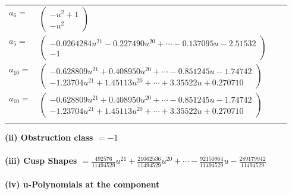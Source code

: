 \documentclass[1p]{elsarticle_modified}
\theoremstyle{definition}
\begin{document}
\begin{tabular}{m{7pt} m{180pt} m{7pt} m{180pt} }
\flushright $a_{6}=$&$\begin{pmatrix}- u^2+1\\- u^2\end{pmatrix}$ \\
\flushright $a_{5}=$&$\begin{pmatrix}-0.0264284 u^{21}-0.227490 u^{20}+\cdots-0.137095 u-2.51532\\-1\end{pmatrix}$ \\
\flushright $a_{10}=$&$\begin{pmatrix}-0.628809 u^{21}+0.408950 u^{20}+\cdots-0.851245 u-1.74742\\-1.23704 u^{21}+1.45113 u^{20}+\cdots+3.35522 u+0.270710\end{pmatrix}$\\ \flushright $a_{10}=$&$\begin{pmatrix}-0.628809 u^{21}+0.408950 u^{20}+\cdots-0.851245 u-1.74742\\-1.23704 u^{21}+1.45113 u^{20}+\cdots+3.35522 u+0.270710\end{pmatrix}$\\&\end{tabular}
\flushleft \textbf{(ii) Obstruction class $= -1$}\\~\\
\flushleft \textbf{(iii) Cusp Shapes $= \frac{492576}{11494529} u^{21}+\frac{21062536}{11494529} u^{20}+\cdots-\frac{92150964}{11494529} u-\frac{289179942}{11494529}$}\\~\\
\newpage\renewcommand{\arraystretch}{1}
\flushleft \textbf{(iv) u-Polynomials at the component}\newline \\
\end{document}
